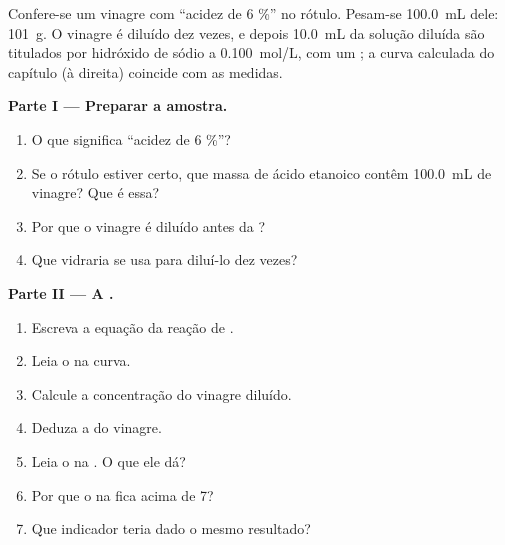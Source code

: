 \begin{problem}
\label{pb:g12:ph-conductivity-titrations:1}
Confere-se um vinagre com ``acidez de 6 \%'' no rótulo. Pesam-se
\qty{100.0}{mL} dele: \qty{101}{g}. O vinagre é diluído dez vezes, e
depois \qty{10.0}{mL} da solução diluída são titulados por hidróxido de
sódio a \qty{0.100}{mol/L}, com um ; a curva calculada do
capítulo (à direita) coincide com as medidas.

\medskip
\noindent\textbf{Parte I --- Preparar a amostra.}
\begin{enumerate}
  \item O que significa ``acidez de 6 \%''?
  \item Se o rótulo estiver certo, que massa de ácido etanoico contêm
        \qty{100.0}{mL} de vinagre? Que  é essa?
  \item Por que o vinagre é diluído antes da ?
  \item Que vidraria se usa para diluí-lo dez vezes?
\end{enumerate}

\medskip
\noindent\textbf{Parte II --- A .}
\begin{enumerate}[resume]
  \item Escreva a equação da reação de .
  \item Leia o  na curva.
  \item Calcule a concentração do vinagre diluído.
  \item Deduza a do vinagre.
  \item Leia o  na . O que ele dá?
  \item Por que o  na  fica acima de 7?
  \item Que indicador teria dado o mesmo resultado?
\end{enumerate}


\end{problem}
